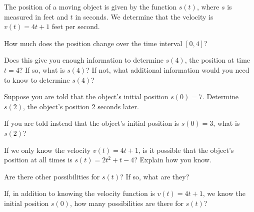 \begin{pa} \label{PA:7.1}
The position of a moving object is given by the function $s(t)$, where $s$ is measured in feet and $t$ in seconds.  We determine that the velocity is $v(t) = 4t + 1$ feet per second. 
\ba
\item How much does the position change over the time interval   $[0,4]$?

\item Does this give you enough information to determine $s(4)$, the position at time $t=4$?  If so, what is $s(4)$?  If not, what additional information would you need to know to determine $s(4)$?

\item Suppose you are told that the object's initial position $s(0) = 7$.  Determine $s(2)$, the object's position $2$ seconds later. 

\item If you are told instead that the object's initial position is $s(0) = 3$, what is $s(2)$?

\item If we only know the velocity $v(t)=4t+1$, is it possible that the object's position at all times is $s(t) = 2t^2 + t - 4$?  Explain how you know.

\item Are there other possibilities for $s(t)$?  If so, what are they?  

\item If, in addition to knowing the velocity function is $v(t) = 4t+1$, we know the initial position $s(0)$, how many possibilities are there for $s(t)$?
\ea
\end{pa} 
\afterpa
